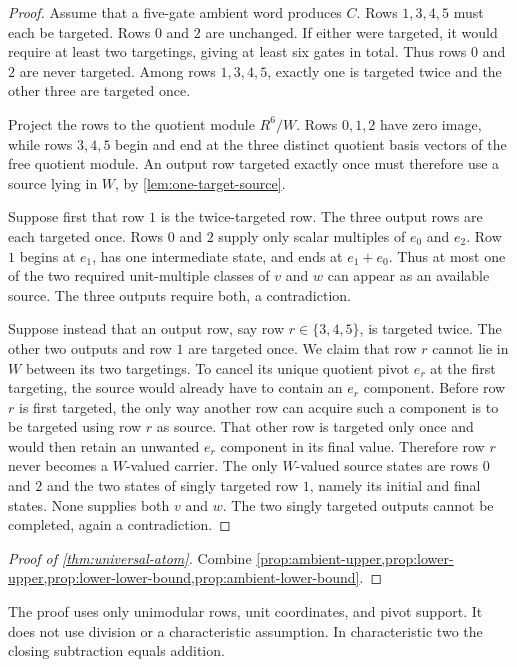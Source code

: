 \begin{proof}
Assume that a five-gate ambient word produces $C$.  Rows $1,3,4,5$ must each be targeted.  Rows $0$ and $2$ are unchanged.  If either were targeted, it would require at least two targetings, giving at least six gates in total.  Thus rows $0$ and $2$ are never targeted.  Among rows $1,3,4,5$, exactly one is targeted twice and the other three are targeted once.

Project the rows to the quotient module $R^6/W$.  Rows $0,1,2$ have zero image, while rows $3,4,5$ begin and end at the three distinct quotient basis vectors of the free quotient module.  An output row targeted exactly once must therefore use a source lying in $W$, by \cref{lem:one-target-source}.

Suppose first that row $1$ is the twice-targeted row.  The three output rows are each targeted once.  Rows $0$ and $2$ supply only scalar multiples of $e_0$ and $e_2$.  Row $1$ begins at $e_1$, has one intermediate state, and ends at $e_1+e_0$.  Thus at most one of the two required unit-multiple classes of $v$ and $w$ can appear as an available source.  The three outputs require both, a contradiction.

Suppose instead that an output row, say row $r\in\{3,4,5\}$, is targeted twice.  The other two outputs and row $1$ are targeted once.  We claim that row $r$ cannot lie in $W$ between its two targetings.  To cancel its unique quotient pivot $e_r$ at the first targeting, the source would already have to contain an $e_r$ component.  Before row $r$ is first targeted, the only way another row can acquire such a component is to be targeted using row $r$ as source.  That other row is targeted only once and would then retain an unwanted $e_r$ component in its final value.  Therefore row $r$ never becomes a $W$-valued carrier.  The only $W$-valued source states are rows $0$ and $2$ and the two states of singly targeted row $1$, namely its initial and final states.  None supplies both $v$ and $w$.  The two singly targeted outputs cannot be completed, again a contradiction.
\end{proof}

\begin{proof}[Proof of \cref{thm:universal-atom}]
Combine \cref{prop:ambient-upper,prop:lower-upper,prop:lower-lower-bound,prop:ambient-lower-bound}.
\end{proof}

\begin{remark}
The proof uses only unimodular rows, unit coordinates, and pivot support.  It does not use division or a characteristic assumption.  In characteristic two the closing subtraction equals addition.
\end{remark}

